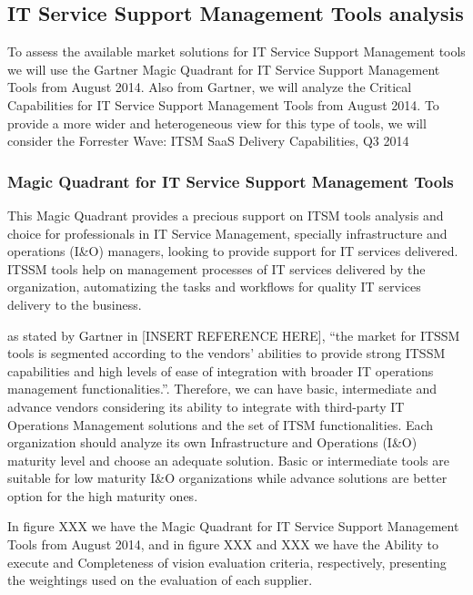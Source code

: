 \subsection{IT Service Support Management Tools analysis}

To assess the available market solutions for IT Service Support Management tools we will use the Gartner Magic Quadrant for IT Service Support Management Tools from August 2014. Also from Gartner, we will analyze the Critical Capabilities for IT Service Support Management Tools from August 2014. To provide a more wider and heterogeneous view for this type of tools, we will consider the Forrester Wave: ITSM SaaS Delivery Capabilities, Q3 2014\par 

\subsubsection{Magic Quadrant for IT Service Support Management Tools}

This Magic Quadrant provides a precious support on ITSM tools analysis and choice for professionals in IT Service Management, specially infrastructure and operations (I\&O) managers, looking to provide support for IT services delivered. ITSSM tools help on management processes of IT services delivered by the organization, automatizing the tasks and workflows for quality IT services delivery to the business.\par
as stated by Gartner in [INSERT REFERENCE HERE], ``the market for ITSSM tools is segmented according to the vendors' abilities to provide strong ITSSM capabilities and high levels of ease of integration with broader IT operations management functionalities.''. Therefore, we can have basic, intermediate and advance vendors considering its ability to integrate with third-party IT Operations Management solutions and the set of ITSM functionalities. Each organization should analyze its own Infrastructure and Operations (I\&O) maturity level and choose an adequate solution. Basic or intermediate tools are suitable for low maturity I\&O organizations while advance solutions are better option for the high maturity ones.\par
In figure XXX we have the Magic Quadrant for IT Service Support Management Tools from August 2014, and in figure XXX and XXX we have the Ability to execute and Completeness of vision evaluation criteria, respectively, presenting the weightings used on the evaluation of each supplier.\par

